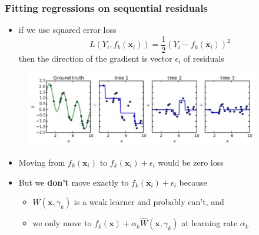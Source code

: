 \documentclass[xcolor={dvipsnames}]{beamer}
\begin{document}
\frame
{
 \frametitle{Fitting regressions on sequential residuals}
\begin{itemize}
\item if we use squared error loss
$$L(Y_i, f_k({\boldsymbol x}_i)) = \frac{1}{2}(Y_i - f_k({\boldsymbol x}_i))^2$$
then the direction of the gradient is vector $ \epsilon_i$ of residuals 
\end{itemize}

\vspace{-2em}
\begin{figure}
\centering
\hspace*{-.75cm}\includegraphics[width=4in]{stuff/residualsgradient.png}
\end{figure}
\vspace{-1.5em}
\begin{itemize}
\item<2-> Moving from $f_k({\boldsymbol x}_i)$ to $f_k({\boldsymbol x}_i) +  \epsilon_i$
 would be zero loss
\item<3-> But we \textbf{don't} move exactly to $f_k({\boldsymbol x}_i) + \epsilon_i$ because
\begin{itemize}
\item<4-> $W({\boldsymbol x}, \gamma_k)$ is a weak learner and probably can't, and
\item<5-> we only move to $f_k({\boldsymbol x}) + \alpha_k \hat W({\boldsymbol x}, \gamma_k)$ at  learning rate $\alpha_k$
\end{itemize}
\end{itemize}

}
\end{document}
